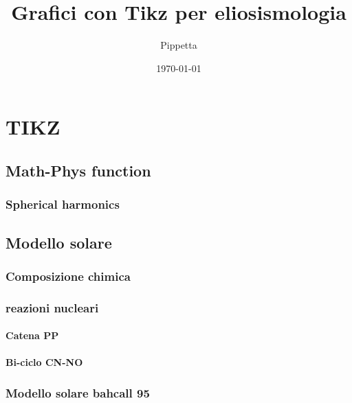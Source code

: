 \documentclass[oneside,12pt,fleqn]{memoir}%
\author{Pippetta}
\title{Grafici con Tikz per eliosismologia}
\date{\today}
\begin{document}
\maketitle
\tableofcontents*

\part{TIKZ}


\chapter{Math-Phys function}

\section{Spherical harmonics}



\chapter{Modello solare}

\section{Composizione chimica}

%

\section{reazioni nucleari}

\subsection{Catena PP}

\subsection{Bi-ciclo CN-NO}

\section{Modello solare bahcall 95}



\end{document}
